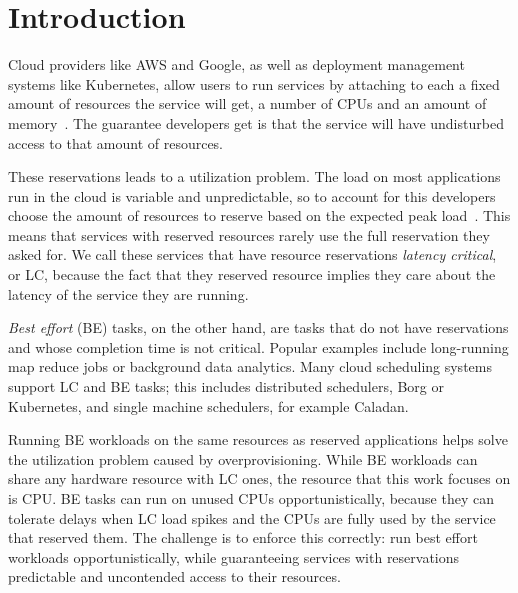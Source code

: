 \section{Introduction}
\label{s:intro}

Cloud providers like AWS and Google, as well as deployment management systems
like Kubernetes, allow users to run services by attaching to each a fixed amount
of resources the service will get, \ie{} a number of CPUs and an amount of
memory~\cite{aws-ec2-resources, kubernetes-resources}. The guarantee developers
get is that the service will have undisturbed access to that amount of
resources.

These reservations leads to a utilization problem. The load on most applications
run in the cloud is variable and unpredictable, so to account for this
developers choose the amount of resources to reserve based on the expected peak
load~\cite{borg, nu, overprovision}. This means that services with reserved
resources rarely use the full reservation they asked for. We call these services
that have resource reservations \textit{latency critical}, or LC, because the
fact that they reserved resource implies they care about the latency of the
service they are running.

\textit{Best effort} (BE) tasks, on the other hand, are tasks that do not have
reservations and whose completion time is not critical. Popular examples include
long-running map reduce jobs or background data analytics. Many cloud scheduling
systems support LC and BE tasks; this includes distributed schedulers, \eg{}
Borg\cite{borg} or Kubernetes\cite{kubernetes-resources}, and single machine
schedulers, for example Caladan\cite{caladan}.

Running BE workloads on the same resources as reserved applications helps solve
the utilization problem caused by overprovisioning. While BE workloads can share
any hardware resource with LC ones, the resource that this work focuses on is
CPU. BE tasks can run on unused CPUs opportunistically, because they can
tolerate delays when LC load spikes and the CPUs are fully used by the service
that reserved them. The challenge is to enforce this correctly: run best effort
workloads opportunistically, while guaranteeing services with reservations
predictable and uncontended access to their resources.



